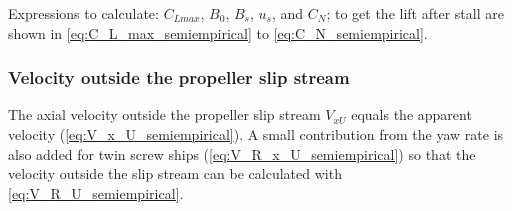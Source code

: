 Expressions to calculate: $C_{Lmax}$, $B_0$, $B_s$, $u_s$, and $C_N$; to get the lift after stall are shown in \autoref{eq:C_L_max_semiempirical} to \autoref{eq:C_N_semiempirical}.
\begin{equation}
    \label{eq:C_L_max_semiempirical}
    
\end{equation}
%
\begin{equation}
    \label{eq:B_0_semiempirical}
    
\end{equation}
%
\begin{equation}
    \label{eq:B_s_semiempirical}
    
\end{equation}
%
\begin{equation}
    \label{eq:u_s_semiempirical}
    
\end{equation}
%
\begin{equation}
    \label{eq:C_N_semiempirical}
    
\end{equation}
%
%
\subsubsection{Velocity outside the propeller slip stream}
\label{sec:propeller_uncovered}
The axial velocity outside the propeller slip stream $V_{xU}$ equals the apparent velocity (\autoref{eq:V_x_U_semiempirical}). A small contribution from the yaw rate is also added for twin screw ships (\autoref{eq:V_R_x_U_semiempirical}) so that the velocity outside the slip stream can be calculated with \autoref{eq:V_R_U_semiempirical}.
\begin{equation}
    \label{eq:V_x_U_semiempirical}
    
\end{equation}
%
\begin{equation}
    \label{eq:V_R_x_U_semiempirical}
    
\end{equation}
%
\begin{equation}
    \label{eq:V_R_U_semiempirical}
    
\end{equation}
%
%
